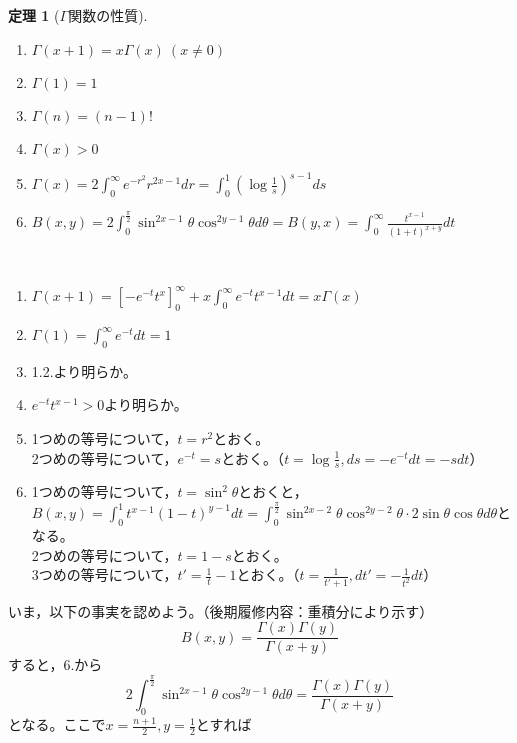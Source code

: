 \documentclass[dvipdfmx,a4j,10pt]{jsarticle}
\makeatletter
\theoremstyle{mystyle1}
\theoremstyle{mystyle2}
\newtheorem{thm*}{定理}
\renewenvironment{proof}[1][\proofname]{\par
  \pushQED{\qed}%
  \normalfont
  \topsep6\p@\@plus6\p@ \trivlist
  \item[\hskip\labelsep{\bfseries\sffamily #1}]\ignorespaces
}{%
  \popQED\endtrivlist\@endpefalse
}
\renewcommand\proofname{証明}
\makeatother
\begin{document}
\begin{proof}[例\ref{ex-beta}の証明]
\begin{thm*}[$\Gamma$関数の性質]\
    \vspace{-\baselineskip}
    \begin{enumerate}
    \item $\displaystyle\Gamma(x+1)=x\Gamma(x)\ (x\neq0)$
    \item $\displaystyle\Gamma(1)=1$
    \item $\displaystyle\Gamma(n)=(n-1)!$
    \item $\displaystyle\Gamma(x)>0$
    \item $\displaystyle\Gamma(x)=2\int_0^\infty e^{-r^2} r^{2x-1}dr=\int_0^1\left(\log{\frac{1}{s}}\right)^{s-1}ds$
    \item $\displaystyle B(x,y)=2\int_0^{\frac{\pi}{2}}\sin^{2x-1}\theta\cos^{2y-1}\theta d\theta=B(y,x)=\int_0^\infty\frac{t^{x-1}}{(1+t)^{x+y}}dt$
    \end{enumerate}
\end{thm*}
\begin{proof}\
\begin{enumerate}
\item $\displaystyle\Gamma(x+1)=[-e^{-t}t^x]_0^\infty+x\int_0^\infty e^{-t}t^{x-1}dt=x\Gamma(x)$
\item $\displaystyle\Gamma(1)=\int_0^\infty e^{-t}dt=1$
\item 1.2.より明らか。
\item $e^{-t}t^{x-1}>0$より明らか。
\item 1つめの等号について，$t=r^2$とおく。\\2つめの等号について，$e^{-t}=s$とおく。（$\displaystyle t=\log\frac{1}{s},ds=-e^{-t}dt=-sdt$）
\item 1つめの等号について，$t=\sin^2\theta$とおくと，\\$\displaystyle B(x,y)=\int_0^1 t^{x-1}(1-t)^{y-1}dt=\int_0^{\frac{\pi}{2}}\sin^{2x-2}\theta\cos^{2y-2}\theta\cdot2\sin\theta\cos\theta d\theta$となる。\\2つめの等号について，$t=1-s$とおく。\\3つめの等号について，$\displaystyle t'=\frac{1}{t}-1$とおく。（$\displaystyle t=\frac{1}{t'+1},dt'=-\frac{1}{t^2}dt$）
\end{enumerate}
\end{proof}
いま，以下の事実を認めよう。（後期履修内容：重積分により示す）
\[
B(x,y)=\frac{\Gamma(x)\Gamma(y)}{\Gamma(x+y)}
\]
すると，6.から
\[
2\int_0^{\frac{\pi}{2}}\sin^{2x-1}\theta\cos^{2y-1}\theta d\theta= \frac{\Gamma(x)\Gamma(y)}{\Gamma(x+y)}
\]
となる。ここで$\displaystyle x=\frac{n+1}{2},y=\frac{1}{2}$とすれば

\end{proof}
\end{document}
